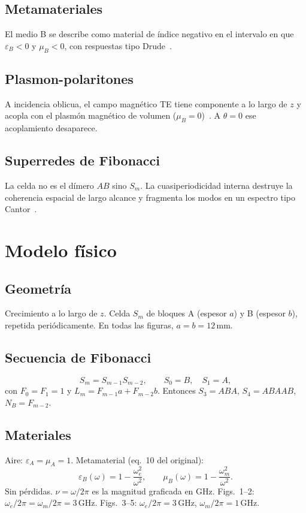 \documentclass[11pt,a4paper]{article}
\begin{document}
\subsection{Metamateriales}
El medio B se describe como material de índice negativo en el intervalo en que
$\varepsilon_B<0$ y $\mu_B<0$, con respuestas tipo Drude~\cite{Veselago1968,Pendry1996,Pacheco2002}.

\subsection{Plasmon-polaritones}
A incidencia oblicua, el campo magnético TE tiene componente a lo largo de $z$ y acopla
con el plasmón magnético de volumen ($\mu_B=0$)~\cite{Reyes2009EPL}. A $\theta=0$ ese acoplamiento
desaparece.

\subsection{Superredes de Fibonacci}
La celda no es el dímero $AB$ sino $S_m$. La cuasiperiodicidad interna destruye la coherencia
espacial de largo alcance y fragmenta los modos en un espectro tipo Cantor~\cite{Kohmoto1983}.

\section{Modelo físico}

\subsection{Geometría}
Crecimiento a lo largo de $z$. Celda $S_m$ de bloques A (espesor $a$) y B (espesor $b$),
repetida periódicamente. En todas las figuras, $a=b=12\,\mathrm{mm}$.

\subsection{Secuencia de Fibonacci}
\begin{equation}
S_m=S_{m-1}S_{m-2},\qquad S_0=B,\quad S_1=A,
\end{equation}
con $F_0=F_1=1$ y $L_m=F_{m-1}a+F_{m-2}b$. Entonces $S_3=ABA$, $S_4=ABAAB$,
$N_B=F_{m-2}$.

\subsection{Materiales}
Aire: $\varepsilon_A=\mu_A=1$. Metamaterial (eq.~10 del original):
\begin{equation}
\varepsilon_B(\omega)=1-\frac{\omega_e^2}{\omega^2},\qquad
\mu_B(\omega)=1-\frac{\omega_m^2}{\omega^2}.
\end{equation}
Sin pérdidas. $\nu=\omega/2\pi$ es la magnitud graficada en GHz.
Figs.~1--2: $\omega_e/2\pi=\omega_m/2\pi=3\,\mathrm{GHz}$.
Figs.~3--5: $\omega_e/2\pi=3\,\mathrm{GHz}$, $\omega_m/2\pi=1\,\mathrm{GHz}$.
\end{document}
